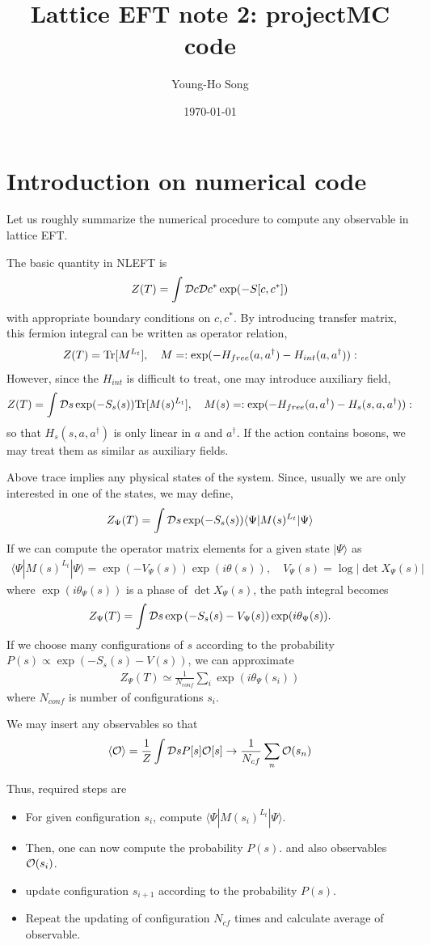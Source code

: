 \documentclass[10pt]{book}
\title{Lattice EFT note 2: projectMC code}
\author{Young-Ho Song}
\date{\today}
\newcommand{\bea}{\begin{eqnarray}}
\newcommand{\eea}{\end{eqnarray}}
\def\la{\langle}
\def\ra{\rangle}
\begin{document}
\maketitle
\tableofcontents

\newpage
\chapter{Introduction on numerical code}
Let us roughly summarize the numerical procedure to compute any observable in lattice EFT. 

The basic quantity in NLEFT is 
\bea 
Z(T)=\int {\cal D} c{\cal D} c^* \exp(-S[c,c^*]) 
\eea 
with appropriate boundary conditions on $c, c^*$. 
By introducing transfer matrix, this fermion integral can be written as
operator relation, 
\bea 
Z(T)={\rm Tr}[ M^{L_t}],\quad M=:\exp(-H_{free}(a,a^\dagger)-H_{int}(a,a^\dagger)):
\eea 
However, since the $H_{int}$ is difficult to treat, one may introduce auxiliary field,
\bea 
Z(T)=\int {\cal D}s \exp(-S_{s}(s)){\rm Tr}[ M(s)^{L_t}],\quad M(s)=:\exp(-H_{free}(a,a^\dagger)-H_{s}(s,a,a^\dagger)): 
\eea 
so that $H_{s}(s,a,a^\dagger)$ is only linear in $a$ and $a^\dagger$. 
If the action contains bosons, we may treat them as similar as auxiliary fields.

Above trace implies any physical states of the system. Since, usually 
we are only interested in one of the states, we may define,
\bea 
Z_\Psi(T)=\int {\cal D}s \exp(-S_{s}(s))\la \Psi| M(s)^{L_t}|\Psi\ra 
\eea 
If we can compute the operator matrix elements for a given state $|\Psi\ra$ as
\bea 
\la \Psi| M(s)^{L_t}|\Psi\ra = \exp(- V_\Psi(s)) \exp(i\theta(s)) , \quad V_\Psi(s)=\log|\det X_\Psi(s)|
\eea 
where $\exp(i\theta_\Psi(s))$ is a phase of $\det X_\Psi(s)$, the path integral becomes
\bea 
Z_\Psi(T)=\int {\cal D}s \exp\left(-S_{s}(s)-V_\Psi(s)\right) \exp(i\theta_\Psi(s)).
\eea  
If we choose many configurations of $s$ according to the 
probability $P(s)\propto \exp\left(-S_{s}(s)-V(s)\right)$, we can approximate 
\bea 
Z_\Psi(T)\simeq \frac{1}{N_{conf}}\sum_{i} \exp(i\theta_\Psi(s_i))
\eea 
where $N_{conf}$ is number of configurations $s_i$. 

We may insert any observables so that 
\bea 
\la {\cal O}\ra =\frac{1}{Z}\int {\cal D} s P[s]{\cal O}[s]\to \frac{1}{N_{cf}}\sum_{n} {\cal O}(s_n)
\eea 

Thus, required steps are 
\begin{itemize} 
\item For given configuration  $s_i$, compute $\la \Psi|M(s_i)^{L_t}|\Psi\ra$. 
\item Then, one can now compute the probability $P(s)$.
      and also observables ${\cal O}(s_i)$.
\item update configuration $s_{i+1}$ according to the probability $P(s)$.
\item Repeat the updating of configuration $N_{cf}$ times and calculate average of observable. 
\end{itemize} 
\end{document}
